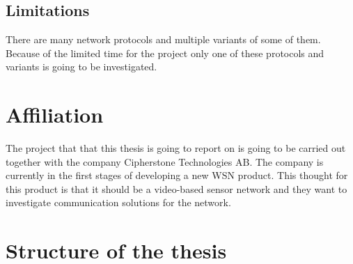 \subsection{Limitations}
There are many network protocols and multiple variants of some of them. Because of the limited time for the project only one of these protocols and variants is going to be investigated. 

\section{Affiliation}
The project that that this thesis is going to report on is going to be carried out together with the company Cipherstone Technologies AB. The company is currently in the first stages of developing a new WSN product. This thought for this product is that it should be a video-based sensor network and they want to investigate communication solutions for the network.

\section{Structure of the thesis}


